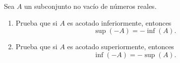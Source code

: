 \documentclass[12pt,a4paper]{article}
\begin{document}
    \begin{problema}
        Sea $A$ un subconjunto no vacío de números reales.
        \begin{enumerate}
            \item[(a)] Prueba que si $A$ es acotado inferiormente, entonces
            \begin{equation*}
                \sup(-A)=-\inf(A).
            \end{equation*}
            \item[(b)] Prueba que si $A$ es acotado superiormente, entonces
            \begin{equation*}
                \inf(-A)=-\sup(A).
            \end{equation*}
        \end{enumerate}
    \end{problema}
\end{document}

